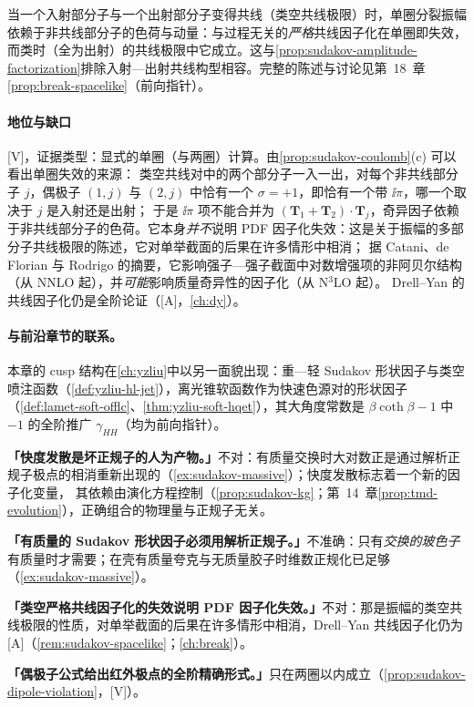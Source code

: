 \begin{remark}\label{rem:sudakov-spacelike}
当一个入射部分子与一个出射部分子变得共线（类空共线极限）时，单圈分裂振幅依赖于非共线部分子的色荷与动量：与过程无关的\emph{严格}共线因子化在单圈即失效，
而类时（全为出射）的共线极限中它成立\cite{CataniDeFlorianRodrigo2012}。这与\cref{prop:sudakov-amplitude-factorization}排除入射—出射共线构型相容。完整的陈述与讨论见第~18~章\cref{prop:break-spacelike}（前向指针）。
\end{remark}

\paragraph{地位与缺口}[V]，证据类型：显式的单圈（与两圈）计算\cite{CataniDeFlorianRodrigo2012}。由\cref{prop:sudakov-coulomb}(c) 可以看出单圈失效的来源：
类空共线对中的两个部分子一入一出，对每个非共线部分子 $j$，偶极子 $(1,j)$ 与 $(2,j)$ 中恰有一个 $\sigma=+1$，即恰有一个带 $\ii\pi$，哪一个取决于 $j$ 是入射还是出射；
于是 $\ii\pi$ 项不能合并为 $(\mathbf T_1+\mathbf T_2)\cdot\mathbf T_j$，奇异因子依赖于非共线部分子的色荷。它本身\emph{并不}说明 PDF 因子化失效：这是关于振幅的多部分子共线极限的陈述，它对单举截面的后果在许多情形中相消；
据 Catani、de Florian 与 Rodrigo 的摘要，它影响强子—强子截面中对数增强项的非阿贝尔结构（从 NNLO 起），并\emph{可能}影响质量奇异性的因子化（从 N$^3$LO 起）。
Drell--Yan 的共线因子化仍是全阶论证（[A]，\cref{ch:dy}）。

\paragraph{与前沿章节的联系。}本章的 cusp 结构在\cref{ch:yzliu}中以另一面貌出现：重—轻 Sudakov 形状因子与类空喷注函数（\cref{def:yzliu-hl-jet}），离光锥软函数作为快速色源对的形状因子
（\cref{def:lamet-soft-offlc}、\cref{thm:yzliu-soft-hqet}），其大角度常数是 $\beta\coth\beta-1$ 中 $-1$ 的全阶推广 $\gamma_{HH}$（均为前向指针）。

\begin{tcolorbox}[enhanced,breakable,title=常见误解,fonttitle=\bfseries,
  colback=gray!3!white,colframe=gray!55!black,boxrule=0.6pt,arc=2pt,
  left=5pt,right=5pt,top=3pt,bottom=3pt,before skip=6pt,after skip=6pt]
\textbf{「快度发散是坏正规子的人为产物。」}不对：有质量交换时大对数正是通过解析正规子极点的相消重新出现的（\cref{ex:sudakov-massive}）；快度发散标志着一个新的因子化变量，
其依赖由演化方程控制（\cref{prop:sudakov-kg}；第~14~章\cref{prop:tmd-evolution}），正确组合的物理量与正规子无关。\par
\textbf{「有质量的 Sudakov 形状因子必须用解析正规子。」}不准确：只有\emph{交换的玻色子}有质量时才需要；在壳有质量夸克与无质量胶子时维数正规化已足够（\cref{ex:sudakov-massive}）。\par
\textbf{「类空严格共线因子化的失效说明 PDF 因子化失效。」}不对：那是振幅的类空共线极限的性质，对单举截面的后果在许多情形中相消，Drell--Yan 共线因子化仍为 [A]（\cref{rem:sudakov-spacelike}；\cref{ch:break}）。\par
\textbf{「偶极子公式给出红外极点的全阶精确形式。」}只在两圈以内成立（\cref{prop:sudakov-dipole-violation}，[V]）。
\end{tcolorbox}

